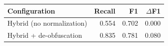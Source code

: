\begin{tabular}{lrrr}
\toprule
Configuration & Recall & F1 & $\Delta$F1 \\
\midrule
Hybrid (no normalization) & 0.554 & 0.702 & 0.000 \\
Hybrid + de-obfuscation & 0.835 & 0.781 & 0.080 \\
\bottomrule
\end{tabular}
